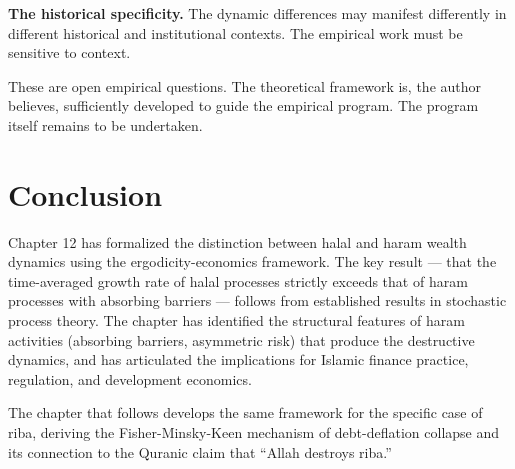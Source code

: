 \textbf{The historical specificity.} The dynamic differences may
manifest differently in different historical and institutional
contexts. The empirical work must be sensitive to context.

These are open empirical questions. The theoretical framework is,
the author believes, sufficiently developed to guide the
empirical program. The program itself remains to be undertaken.

\section{Conclusion}

Chapter 12 has formalized the distinction between halal and haram
wealth dynamics using the ergodicity-economics framework. The key
result --- that the time-averaged growth rate of halal processes
strictly exceeds that of haram processes with absorbing barriers
--- follows from established results in stochastic process theory.
The chapter has identified the structural features of haram
activities (absorbing barriers, asymmetric risk) that produce the
destructive dynamics, and has articulated the implications for
Islamic finance practice, regulation, and development economics.

The chapter that follows develops the same framework for the
specific case of riba, deriving the Fisher-Minsky-Keen mechanism
of debt-deflation collapse and its connection to the Quranic
claim that ``Allah destroys riba.''

